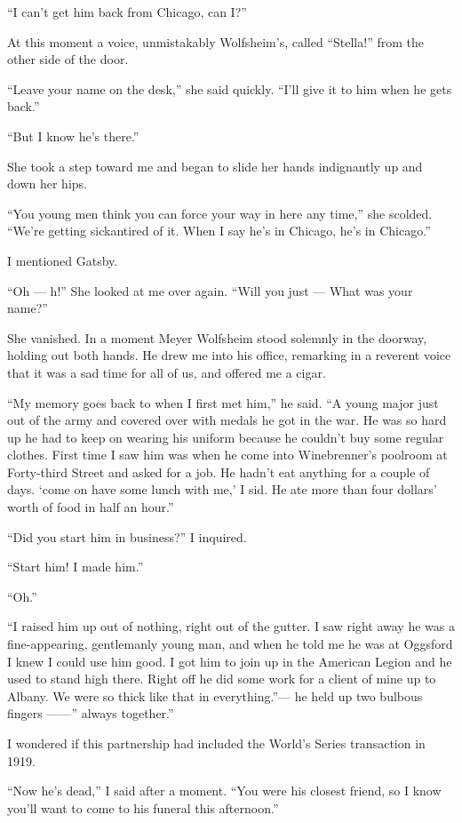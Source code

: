 \documentclass{znotebook}
\begin{document}
``I can't get him back from Chicago, can I?''

At this moment a voice, unmistakably Wolfsheim's, called ``Stella!'' from the other side of the door.

``Leave your name on the desk,'' she said quickly. ``I'll give it to him when he gets back.''

``But I know he's there.''

She took a step toward me and began to slide her hands indignantly up and down her hips.

``You young men think you can force your way in here any time,'' she scolded. ``We're getting sickantired of it. When I say he's in Chicago, he's in Chicago.''

I mentioned Gatsby.

``Oh — h!'' She looked at me over again. ``Will you just — What was your name?''

She vanished. In a moment Meyer Wolfsheim stood solemnly in the doorway, holding out both hands. He drew me into his office, remarking in a reverent voice that it was a sad time for all of us, and offered me a cigar.

``My memory goes back to when I first met him,'' he said. ``A young major just out of the army and covered over with medals he got in the war. He was so hard up he had to keep on wearing his uniform because he couldn't buy some regular clothes. First time I saw him was when he come into Winebrenner's poolroom at Forty-third Street and asked for a job. He hadn't eat anything for a couple of days. ‘come on have some lunch with me,' I sid. He ate more than four dollars' worth of food in half an hour.''

``Did you start him in business?'' I inquired.

``Start him! I made him.''

``Oh.''

``I raised him up out of nothing, right out of the gutter. I saw right away he was a fine-appearing, gentlemanly young man, and when he told me he was at Oggsford I knew I could use him good. I got him to join up in the American Legion and he used to stand high there. Right off he did some work for a client of mine up to Albany. We were so thick like that in everything.''— he held up two bulbous fingers ——'' always together.''

I wondered if this partnership had included the World's Series transaction in 1919.

``Now he's dead,'' I said after a moment. ``You were his closest friend, so I know you'll want to come to his funeral this afternoon.''
\end{document}
